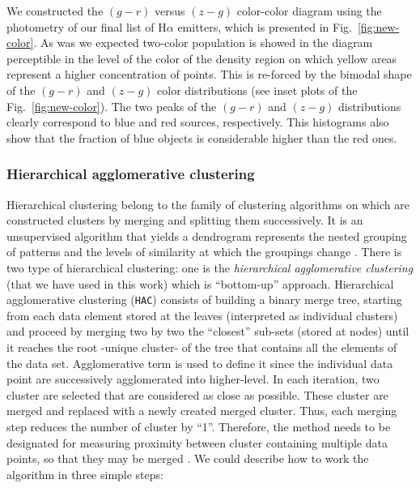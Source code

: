 \documentclass[fleqn,usenatbib]{mnras}
\begin{document}
{We constructed the $(g - r)$ versus $(z - g)$ color-color diagram using the photometry of
our final list of H{$\alpha$} emitters, which is presented in Fig.~\ref{fig:new-color}.
As was we expected two-color population is showed in the diagram perceptible in the level of the
color of the density region on which yellow areas represent a higher concentration of points. This is re-forced by the bimodal shape of the $(g - r)$ and $(z - g)$ color distributions (see inset
plots of the Fig.~\ref{fig:new-color}). The two peaks of the $(g - r)$ and $(z - g)$
distributions clearly correspond to blue and red sources, respectively. This histograms also
show that the fraction of blue objects is considerable higher than the red ones.

\subsubsection{Hierarchical agglomerative clustering}
\label{sec:Hierar}

Hierarchical clustering belong to the family of clustering algorithms
on which are constructed clusters by merging and splitting them successively.
It is an unsupervised algorithm that yields a dendrogram
represents the nested grouping of patterns and the levels of similarity
at which the groupings change \citep{Jain:1999}. There is two type of hierarchical
clustering: one is the \textit{hierarchical agglomerative clustering} (that we have
used in this work) which is ``bottom-up'' approach. Hierarchical agglomerative
clustering (\texttt{HAC}) consists of building a binary merge tree, starting from 
each data element stored at the leaves (interpreted as individual clusters)
and proceed by merging two by two the ``closest'' sub-sets (stored at nodes)
until it reaches the root -unique cluster- of the tree that contains all the elements
of the data set. Agglomerative term is used  to define it since the individual data
point are successively agglomerated into higher-level. In each  iteration, two cluster
are selected that are considered as close as possible. These cluster are merged and
replaced with a newly created merged cluster. Thus, each merging step reduces
the number of cluster by ``1''. Therefore, the method needs to be designated for
measuring proximity between cluster containing multiple data points, so that
they may be merged \citep{Mann:2013, Aggarwal:2015}. We could describe how to
work the algorithm in three simple steps:

}
\end{document}
